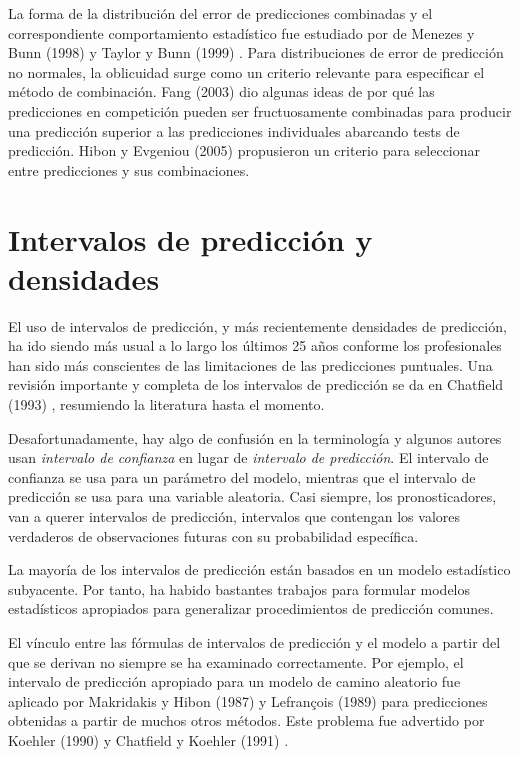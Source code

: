 \documentclass{llncs}
\begin{document}
La forma de la distribución del error de predicciones combinadas y el correspondiente comportamiento estadístico fue estudiado por de Menezes y Bunn (1998) \cite{DeMenezes1998415} y Taylor y Bunn (1999) \cite{Taylor1999325}. Para distribuciones de error de predicción  no normales, la oblicuidad surge como un criterio relevante para especificar el método de combinación. Fang (2003) \cite{Fang200387} dio algunas ideas de por qué las predicciones en competición pueden ser fructuosamente combinadas para producir una predicción superior a las predicciones individuales abarcando tests de predicción. Hibon y Evgeniou (2005) \cite{Hibon200515} propusieron un criterio para seleccionar entre predicciones y sus combinaciones.

\section{Intervalos de predicción y densidades}
El uso de intervalos de predicción, y más recientemente densidades de predicción, ha ido siendo más usual a lo largo los últimos 25 años conforme los profesionales han sido más conscientes de las limitaciones de las predicciones puntuales. Una revisión importante y completa de los intervalos de predicción se da en Chatfield (1993) \cite{Chatfield1993121}, resumiendo la literatura hasta el momento.

Desafortunadamente, hay algo de confusión en la terminología y algunos autores usan \emph{intervalo de confianza} en lugar de \emph{ intervalo de predicción}. El intervalo de confianza se usa para un parámetro del modelo, mientras que el intervalo de predicción se usa para una variable aleatoria. Casi siempre, los pronosticadores, van a querer intervalos de predicción, intervalos que contengan los valores verdaderos de observaciones futuras con su probabilidad específica.

La mayoría de los intervalos de predicción están basados en un modelo estadístico subyacente. Por tanto, ha habido bastantes trabajos para formular modelos estadísticos apropiados para generalizar procedimientos de predicción comunes.

El vínculo entre las fórmulas de intervalos de predicción y el modelo a partir del que se derivan no siempre se ha examinado correctamente. Por ejemplo, el intervalo de predicción apropiado para un modelo de camino aleatorio fue aplicado por Makridakis y Hibon (1987) \cite{Makridakis1987489} y Lefrançois (1989) \cite{Lefrancois1989553} para predicciones obtenidas a partir de muchos otros métodos. Este problema fue advertido por Koehler (1990) \cite{Koehler1990557} y Chatfield y Koehler (1991) \cite{Chatfield1991239}.
\end{document}
